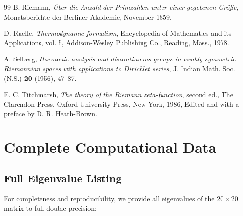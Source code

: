 \documentclass[12pt,letterpaper]{article}
\theoremstyle{plain}
\theoremstyle{definition}
\theoremstyle{remark}
\begin{document}
\begin{thebibliography}{99}
 B. Riemann, \emph{Über die Anzahl der Primzahlen unter einer gegebenen Größe}, Monatsberichte der Berliner Akademie, November 1859.

 D. Ruelle, \emph{Thermodynamic formalism}, Encyclopedia of Mathematics and its Applications, vol. 5, Addison-Wesley Publishing Co., Reading, Mass., 1978.

 A. Selberg, \emph{Harmonic analysis and discontinuous groups in weakly symmetric Riemannian spaces with applications to Dirichlet series}, J. Indian Math. Soc. (N.S.) \textbf{20} (1956), 47--87.

 E. C. Titchmarsh, \emph{The theory of the Riemann zeta-function}, second ed., The Clarendon Press, Oxford University Press, New York, 1986, Edited and with a preface by D. R. Heath-Brown.

\end{thebibliography}
\pagebreak

\appendix

\section{Complete Computational Data}

\subsection{Full Eigenvalue Listing}

For completeness and reproducibility, we provide all eigenvalues of the $20 \times 20$ matrix to full double precision:
\end{document}

